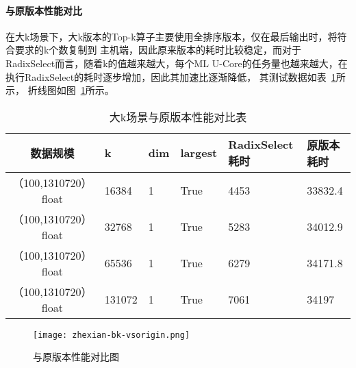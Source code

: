 \paragraph{与原版本性能对比}
在大k场景下，大k版本的Top-k算子主要使用全排序版本，仅在最后输出时，将符合要求的k个数复制到
主机端，因此原来版本的耗时比较稳定，而对于RadixSelect而言，随着k的值越来越大，每个ML
U-Core的任务量也越来越大，在执行RadixSelect的耗时逐步增加，因此其加速比逐渐降低，
其测试数据如表~\ref{tab:bench_bigk}所示，
折线图如图~\ref{fig:bench_bk_vsorigin_zhexian}所示。
\begin{table}
    \centering
    \caption{大k场景与原版本性能对比表}
    \label{tab:bench_bigk}
    \begin{tabular}{clllll}
        \toprule
        数据规模       &k  & dim  & largest & RadixSelect耗时    & 原版本耗时 \\
        \midrule
        （100,1310720） float&16384&  1     & True      & 4453 & 33832.4 \\
        （100,1310720） float&32768&  1     & True      & 5283 & 34012.9  \\
        （100,1310720） float&65536&  1     & True      & 6279 & 34171.8 \\
        （100,1310720） float&131072&  1     & True      & 7061 & 34197 \\
        
        \bottomrule
    \end{tabular}
    \end{table}
    \begin{figure}[ht]
        \centering
        \texttt{[image: zhexian-bk-vsorigin.png]}
        \caption{与原版本性能对比图}
        \label{fig:bench_bk_vsorigin_zhexian}
    \end{figure}
    
    


